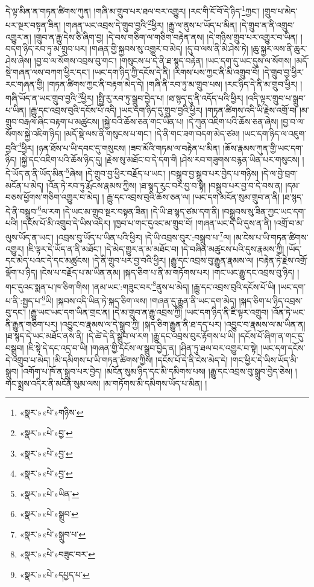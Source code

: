 དེ་ལྟ་མིན་ན་གཏན་ཚིགས་ཀུན། །གཞི་མ་གྲུབ་པར་ཐལ་བར་འགྱུར། །རང་གི་ངོ་བོ་དེ་ཉིད་\footnote{«སྣར་»«པེ་»གཉིས་}ཀྱང་། །གྲུབ་པ་མེད་པར་སྔར་བསྟན་ཟིན། །གཞན་ཡང་འབྲས་དེ་གྲུབ་བྱའི་\footnote{«སྣར་»«པེ་»བྱ་}ཕྱིར། །རྒྱུ་ལ་ནུས་པ་ཡོད་པ་མིན། །དེ་གྲུབ་ན་ནི་འགྲུབ་འགྱུར་ན། །གྲུབ་ན་རྒྱུ་དེས་ཅི་ཞིག་བྱ། །དེ་བས་གཅིག་ལ་གཅིག་བརྟེན་ནས། །དེ་གཉིས་གྲུབ་པར་འགྱུར་བ་ཡིན། །བདག་ཉིད་རབ་ཏུ་མ་གྲུབ་པར། །གཞན་གྱི་སྐྱབས་སུ་འགྱུར་བ་མེད། །དུ་བ་ལས་ནི་མེ་ཤེས་ཏེ། །ཆུ་སྐྱར་ལས་ནི་ཆུར་ཤེས་ཞེས། །བྱ་བ་ལ་སོགས་འབྲས་བུ་གང་། །གསུངས་པ་དེ་ནི་ཐ་སྙད་བརྟེན། །ཡང་དག་དུ་ཡང་དུས་ལ་སོགས། །མདོ་སྡེ་གཞན་ལས་བཀག་ཕྱིར་དང་། །ཡང་དག་ཉིད་ཀྱི་དངོས་དེ་ནི། །རིགས་པས་ཀྱང་ནི་མི་འགྲུབ་བོ། །དེ་གྲུབ་བྱ་ཕྱིར་རང་གཞན་གྱི། །གཏན་ཚིགས་ཀྱང་ནི་བརྟག་མེད་དེ། །གཞི་ནི་རབ་ཏུ་མ་གྲུབ་པས། །རང་ཉིད་དེ་ནི་མ་གྲུབ་ཕྱིར། །གཞི་ཡོད་ན་ཡང་གྲུབ་བྱའི་\footnote{«སྣར་»«པེ་»བྱ་}ཕྱིར། །སྤྱི་རུ་རབ་ཏུ་སྒྲུབ་བྱེད་པ། །ཐ་སྙད་དུ་ནི་འདོད་པའི་ཕྱིར། །འདི་ལྟར་གྲུབ་པ་སྒྲུབ་པ་ཡིན། །རྒྱུ་དང་འབྲས་བུའི་དངོས་པོ་འདི། །ཡང་དག་ཉིད་དུ་གྲུབ་བྱའི་ཕྱིར། །གཏན་ཚིགས་འདི་ཡི་རྗེས་འགྲོ་བ། །མ་གྲུབ་བརྒལ་ཞིང་བརྟག་པ་མཚུངས། །སྐྱེ་བའི་ཆོས་ཅན་གང་ཡིན་པ། །དེ་ཀུན་འཇིག་པའི་ཆོས་ཅན་ཞེས། །བྱ་བ་ལ་སོགས་སྐྱེ་འཇིག་ཉིད། །མདོ་སྡེ་ལས་ནི་གསུངས་པ་གང་། །དེ་ནི་གང་ཟག་བདག་མེད་ཙམ། །ཡང་དག་ཉིད་ལ་འཇུག་བྱའི་\footnote{«སྣར་»«པེ་»བྱ་}ཕྱིར། །ཉན་ཐོས་པ་ཡི་དབང་དུ་གསུངས། །ཟབ་མོའི་གཏམ་ལ་བརྟེན་པ་མིན། །ཆོས་རྣམས་ཀུན་གྱི་ཡང་དག་ཉིད། །སྐྱེ་དང་འཇིག་པའི་ཆོས་ཉིད་དུ། །རྗེས་སུ་མཐོང་བ་དེ་དག་གི །ཤེས་རབ་གཟུགས་བརྙན་ཡིན་པར་གསུངས། །དེ་ཡོད་ན་ནི་ཡོད་མིན་\footnote{«སྣར་»«པེ་»ཡིན་}ཞེས། །དེ་གྲུབ་བྱ་ཕྱིར་བརྗོད་པ་ཡང་། །བསྒྲུབ་བྱ་སྒྲུབ་པར་བྱེད་པ་གཉིས། །དེ་ལ་བྱེ་བྲག་མངོན་པ་མེད། །འོན་ཏེ་རབ་ཏུ་རྨོངས་རྣམས་ཀྱིས། །ཐ་སྙད་རུང་བར་བྱ་བ་སྟེ། །བསྒྲུབ་པར་བྱ་བ་དེ་བས་ན། །དམ་བཅས་ཕྱོགས་གཅིག་འགྱུར་བ་མེད། །
རྒྱུ་དང་འབྲས་བུའི་ཆོས་ཅན་ལ། །ཡང་དག་མངོན་སུམ་གྲུབ་ན་ནི། །ཐ་སྙད་དེ་ནི་བསྒྲུབ་\footnote{«སྣར་»«པེ་»སྒྲུབ་}ལ་རག །དེ་ཡང་མ་གྲུབ་སྔར་བསྟན་ཟིན། །དེ་ཡི་ཐ་སྙད་ཙམ་དག་ནི། །བསྒྲུབས་སུ་ཟིན་ཀྱང་ཡང་དག་པའི། །དངོས་པོ་མི་འགྲུབ་དེ་ཡིས་འདིར། །ཁྱབ་པ་གང་དུའང་མ་གྲུབ་བོ། །གཞན་ཡང་དེ་ཡི་དུས་ན་ནི། །འགྲོ་བ་མ་ལུས་ཡོད་ན་ཡང་། །འབྲས་བུ་ཡོད་པ་ཡིན་པའི་ཕྱིར། །དེ་ཡི་འབྲས་བུར་:བསྒྲུབ་པ་\footnote{«སྣར་»«པེ་»སྒྲུབ་པ་}ལ། །མ་ངེས་པ་ཡི་གཏན་ཚིགས་འགྱུར། །ཇི་ལྟར་དེ་ཡོད་ན་ནི་མཐོང་། །དེ་མེད་གྱུར་ན་མ་མཐོང་བ། །དེ་བཞིན་མཚུངས་པའི་དུས་རྣམས་ཀྱི། །ཡོད་དང་མེད་པའང་དེ་དང་མཚུངས། །དེ་ནི་གྲུབ་པར་བྱ་བའི་ཕྱིར། །རྒྱུ་དང་འབྲས་བུ་རྒྱུན་རྣམས་ལ། །བརྟེན་ཏེ་རྗེས་འགྲོ་ལྡོག་པ་ཉིད། །ངེས་པ་བརྗོད་པ་མ་ཡིན་ནམ། །སྐད་ཅིག་པ་ནི་མ་གཏོགས་པར། །གང་ཡང་རྒྱུ་དང་འབྲས་བུ་ཉིད། །གང་དུའང་སྨན་པ་ཁ་ཅིག་གིས། །ནམ་ཡང་:གཟུང་བར་\footnote{«སྣར་»«པེ་»བཟུང་བར་}ནུས་པ་མེད། །རྒྱུ་དང་འབྲས་བུའི་དངོས་པོ་ཡི། །ཡང་དག་པ་ནི་:སྤྱད་པ་\footnote{«སྣར་»«པེ་»དཔྱད་པ་}ཡི། །སྐབས་འདི་ཡིན་ཏེ་སྐད་ཅིག་ལས། །གཞན་དུ་རྒྱུན་ནི་ཡང་དག་མེད། །སྐད་ཅིག་པ་ཉིད་འབྲས་བུ་དང་། །རྒྱུ་ཡང་ཡང་དག་ཡིན་གྲང་ན། །དེ་མ་གྲུབ་ན་རྒྱུ་འབྲས་ཀྱི། །ཡང་དག་ཉིད་ནི་ཇི་ལྟར་འགྲུབ། །འོན་ཏེ་ཡང་ནི་རྒྱུན་གཅིག་པར། །འབྱུང་བ་རྣམས་ལ་དེ་སྒྲུབ་ཀྱི། །སྐད་ཅིག་རྒྱུན་ནི་ཐ་དད་པར། །འབྱུང་བ་རྣམས་ལ་མ་ཡིན་ན། །ཐ་སྙད་དེ་ཡང་མཐོང་ནས་ནི། །དེ་ཚེ་དེ་ནི་སྒྲུབ་ལ་རག །རྒྱུ་དང་འབྲས་བུར་རྟོགས་པ་ཡི། །དངོས་པོ་ཞིག་ན་གང་དུ་བསྒྲུབ། །ཇི་སྟེ་དེ་དང་འདྲ་བ་ཡི། །གཞན་གྱི་དངོས་ལ་སྒྲུབ་བྱེད་ན། །ཤིན་ཏུ་ཐལ་བར་འགྱུར་བ་སྟེ། །ཡང་དག་དངོས་དེ་འགྲུབ་པ་མེད། །མི་དམིགས་པ་ཡི་གཏན་ཚིགས་ཀྱིས། །དངོས་པོ་དེ་ནི་ངེས་མེད་དེ། །གང་ཕྱིར་དེ་ཡིས་ཡོད་མི་སྒྲུབ། །འགོག་པ་ཁོ་ན་སྒྲུབ་པར་བྱེད། །མངོན་སུམ་ཉིད་དང་མི་དམིགས་པས། །རྒྱུ་དང་འབྲས་བུ་སྒྲུབ་བྱེད་ཅེས། །གང་སྨྲས་འདིར་ནི་མངོན་སུམ་ལས། །མ་གཏོགས་མི་དམིགས་ཡོད་པ་མིན། །
